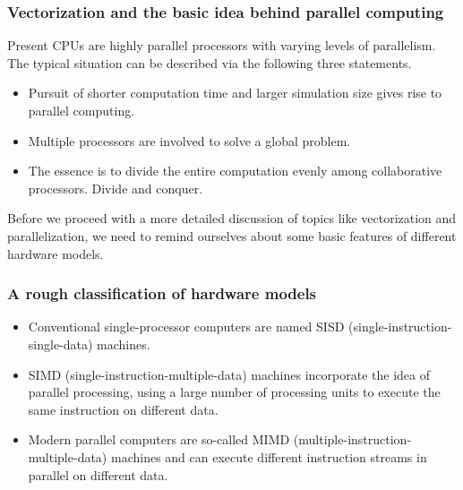 \documentclass{beamer}
\begin{document}
\begin{frame}
\frametitle{Vectorization and the basic idea behind parallel computing}

\begin{block}{}
Present CPUs are highly parallel processors with varying levels of parallelism. The typical situation can be described via the following three statements.
\begin{itemize}
\item Pursuit of shorter computation time and larger simulation size gives rise to parallel computing.

\item Multiple processors are involved to solve a global problem.

\item The essence is to divide the entire computation evenly among collaborative processors.  Divide and conquer.
\end{itemize}

\noindent
Before we proceed with a more detailed discussion of topics like vectorization and parallelization, we need to remind ourselves about some basic features of different hardware models. 

\end{block}
\end{frame}

\begin{frame}
\frametitle{A rough classification of hardware models}

\begin{block}{}

\begin{itemize}
\item Conventional single-processor computers are named SISD (single-instruction-single-data) machines.

\item SIMD (single-instruction-multiple-data) machines incorporate the idea of parallel processing, using a large number of processing units to execute the same instruction on different data.

\item Modern parallel computers are so-called MIMD (multiple-instruction-multiple-data) machines and can execute different instruction streams in parallel on different data.
\end{itemize}

\noindent
\end{block}
\end{frame}
\end{document}
